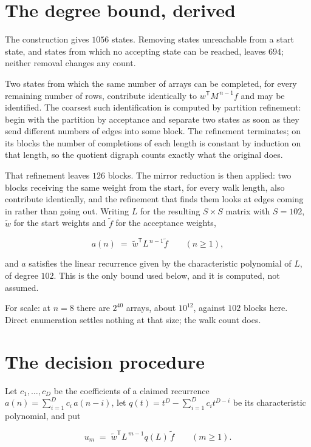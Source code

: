 \documentclass[11pt]{article}
\theoremstyle{definition}
\begin{document}
\section{The degree bound, derived}

The construction gives $1056$ states. Removing states unreachable from a start state, and states from which no accepting state can be reached, leaves $694$; neither removal changes any count.

Two states from which the same number of arrays can be completed, for every remaining number of rows, contribute identically to $w^{\mathsf T}M^{\,n-1}f$ and may be identified. The coarsest such identification is computed by partition refinement: begin with the partition by acceptance and separate two states as soon as they send different numbers of edges into some block. The refinement terminates; on its blocks the number of completions of each length is constant by induction on that length, so the quotient digraph counts exactly what the original does.

That refinement leaves $126$ blocks. The mirror reduction is then applied: two blocks receiving the same weight from the start, for every walk length, also contribute identically, and the refinement that finds them looks at edges coming in rather than going out. Writing $L$ for the resulting $S \times S$ matrix with $S = 102$, $\tilde w$ for the start weights and $\tilde f$ for the acceptance weights,

\[a(n) \;=\; \tilde w^{\mathsf T} L^{\,n-1} \tilde f \qquad (n \ge 1),\]

and $a$ satisfies the linear recurrence given by the characteristic polynomial of $L$, of degree $102$. This is the only bound used below, and it is computed, not assumed.

For scale: at $n = 8$ there are $2^{40}$ arrays, about $10^{12}$, against $102$ blocks here. Direct enumeration settles nothing at that size; the walk count does.

\section{The decision procedure}

Let $c_1,\dots,c_D$ be the coefficients of a claimed recurrence $a(n) = \sum_{i=1}^{D} c_i\,a(n-i)$, let $q(t) = t^{D} - \sum_{i=1}^{D} c_i t^{D-i}$ be its characteristic polynomial, and put

\[u_m \;=\; \tilde w^{\mathsf T} L^{\,m-1} q(L)\,\tilde f \qquad (m \ge 1).\]
\end{document}
